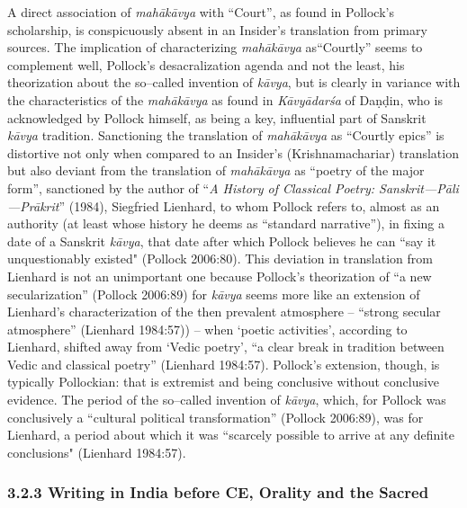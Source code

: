 A direct association of \textit{mahākāvya} with “Court”, as found in Pollock’s scholarship, is conspicuously absent in an Insider’s translation from primary sources. The implication of characterizing \textit{mahākāvya} as\break “Courtly” seems to complement well, Pollock’s desacralization agenda and not the least, his theorization about the so–called invention of \textit{kāvya}, but is clearly in variance with the characteristics of the \textit{mahā\-kāvya} as found in \textit{Kāvyādarśa} of Daṇḍin, who is acknowledged by Pollock himself, as being a key, influential part of Sanskrit \textit{kāvya} tradition. Sanctioning the translation of \textit{mahākāvya} as “Courtly epics” is distortive not only when compared to an Insider’s (Krishnamachariar) translation but also deviant from the translation of \textit{mahākāvya} as “poetry of the major form”, sanctioned by the author of “\textit{A History of Classical Poetry: Sanskrit—Pāli—Prākrit}”\textit{} (1984), Siegfried Lienhard, to whom Pollock refers to, almost as an authority (at least whose history he deems as “standard narrative”), in fixing a date of a Sanskrit \textit{kāvya}, that date after which Pollock believes he can “say it unquestionably existed" (Pollock 2006:80). This deviation in translation from Lienhard is not an unimportant one because Pollock’s theorization of “a new secularization” (Pollock 2006:89) for \textit{kāvya} seems more like an extension of Lienhard’s characterization of the then prevalent atmosphere – “strong secular atmosphere” (Lienhard 1984:57)) – when ‘poetic activities’, according to Lienhard, shifted away from ‘Vedic poetry’, “a clear break in tradition between Vedic and classical poetry” (Lienhard 1984:57). Pollock’s extension, though, is typically Pollockian: that is extremist and being conclusive without conclusive evidence. The period of the so–called invention of \textit{kāvya}, which, for Pollock was conclusively a “cultural political transformation” (Pollock 2006:89), was for Lienhard, a period about which it was “scarcely possible to arrive at any definite conclusions" (Lienhard 1984:57).


\subsubsection*{3.2.3 Writing in India before CE, Orality and the Sacred}

\vskip -3pt

